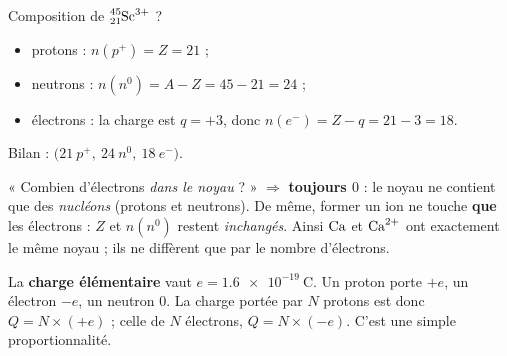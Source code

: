 \documentclass[11pt,a4paper]{article}
\begin{document}
\begin{exemplebox}
Composition de $\ce{^{45}_{21}Sc^{3+}}$ ?
\begin{itemize}[leftmargin=1.5em,topsep=2pt,itemsep=1pt]
  \item protons : $n(p^+) = Z = 21$ ;
  \item neutrons : $n(n^0) = A - Z = 45 - 21 = 24$ ;
  \item électrons : la charge est $q = +3$, donc $n(e^-) = Z - q = 21 - 3 = 18$.
\end{itemize}
Bilan : $\big(21\ p^+,\ 24\ n^0,\ 18\ e^-\big)$.
\end{exemplebox}

\begin{piege}
« Combien d'électrons \emph{dans le noyau} ? » $\Rightarrow$ \textbf{toujours $0$} : le noyau ne contient
que des \emph{nucléons} (protons et neutrons). De même, former un ion ne touche \textbf{que} les
électrons : $Z$ et $n(n^0)$ restent \emph{inchangés}. Ainsi $\ce{Ca}$ et $\ce{Ca^{2+}}$ ont exactement
le même noyau ; ils ne diffèrent que par le nombre d'électrons.
\end{piege}

\begin{remarque}
La \textbf{charge élémentaire} vaut $e = \SI{1,6e-19}{\coulomb}$. Un proton porte $+e$, un électron
$-e$, un neutron $0$. La charge portée par $N$ protons est donc $Q = N \times (+e)$ ; celle de $N$
électrons, $Q = N \times (-e)$. C'est une simple proportionnalité.
\end{remarque}
\end{document}
